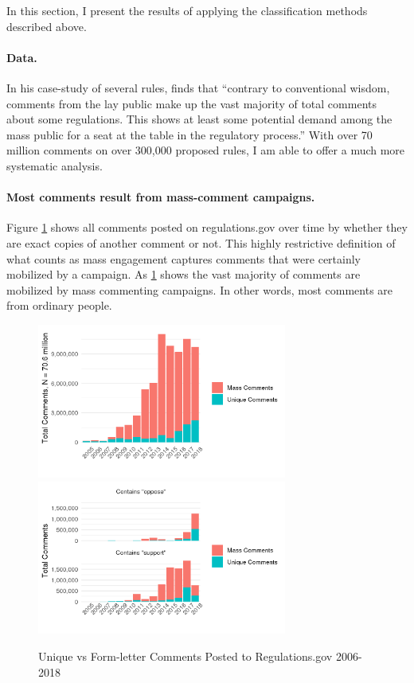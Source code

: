 
In this section, I present the results of applying the classification methods described above.

\paragraph{Data.}
In his case-study of several rules, \citet{Cuellar2005} finds that ``contrary to conventional wisdom, comments from the lay public make up the vast majority of total comments about some regulations. This shows at least some potential demand among the mass public for a seat at the table in the regulatory process.'' 
With over 70 million comments on over 300,000 proposed rules, I am able to offer a much more systematic analysis. 

\paragraph{Most comments result from mass-comment campaigns.}
Figure \ref{fig:comments-mass} shows all comments posted on regulations.gov over time by whether they are exact copies of another comment or not. This highly restrictive definition of what counts as mass engagement captures comments that were certainly mobilized by a campaign. As \ref{fig:comments-mass} shows the vast majority of comments are mobilized by mass commenting campaigns. In other words, most comments are from ordinary people.

\begin{figure}[h!]
    \centering
        \caption{Unique vs Form-letter Comments Posted to Regulations.gov 2006-2018}
    \includegraphics[height =2in]{Figs/comments-mass-vs-unique-1.png}
    \includegraphics[height =2in]{Figs/comments-mass-support-vs-oppose-1.png}

    \label{fig:comments-mass}
\end{figure}


